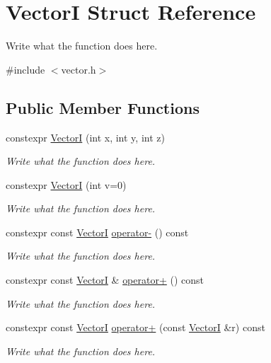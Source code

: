 \hypertarget{structVectorI}{\section{Vector\+I Struct Reference}
\label{structVectorI}
}


Write what the function does here.  




{\ttfamily \#include $<$vector.\+h$>$}

\subsection*{Public Member Functions}
\begin{DoxyCompactItemize}
\item 
constexpr \hyperlink{structVectorI_a989706d00480783979c9ff9c34461c5e}{Vector\+I} (int x, int y, int z)
\begin{DoxyCompactList}\small\item\em Write what the function does here. \end{DoxyCompactList}\item 
constexpr \hyperlink{structVectorI_a34dfea0ceb94bb4d4640037c5e1c84b7}{Vector\+I} (int v=0)
\begin{DoxyCompactList}\small\item\em Write what the function does here. \end{DoxyCompactList}\item 
constexpr const \hyperlink{structVectorI}{Vector\+I} \hyperlink{structVectorI_aec9804d8e49cd13029953b4f735b17b3}{operator-\/} () const 
\begin{DoxyCompactList}\small\item\em Write what the function does here. \end{DoxyCompactList}\item 
constexpr const \hyperlink{structVectorI}{Vector\+I} \& \hyperlink{structVectorI_a4823315c95c48f524d749d2a672036a4}{operator+} () const 
\begin{DoxyCompactList}\small\item\em Write what the function does here. \end{DoxyCompactList}\item 
constexpr const \hyperlink{structVectorI}{Vector\+I} \hyperlink{structVectorI_a7923217e5adb732f91df26fb707639f5}{operator+} (const \hyperlink{structVectorI}{Vector\+I} \&r) const 
\begin{DoxyCompactList}\small\item\em Write what the function does here. \end{DoxyCompactList}\item 

\end{DoxyCompactItemize}
